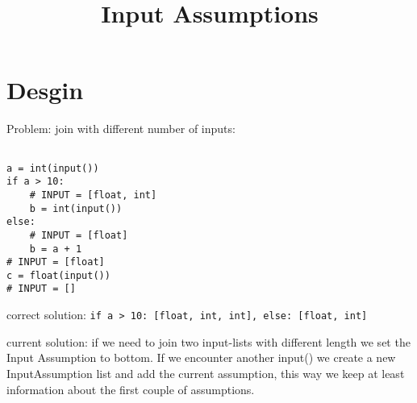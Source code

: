\documentclass[11pt]{article}
\begin{document}
\title{Input Assumptions}

\maketitle


\section{Desgin}

Problem: join with different number of inputs:

\begin{lstlisting}[numbers=none]

a = int(input())
if a > 10:
    # INPUT = [float, int]
    b = int(input())
else:
    # INPUT = [float]
    b = a + 1
# INPUT = [float]
c = float(input())
# INPUT = []
\end{lstlisting}

correct solution: \verb|if a > 10: [float, int, int], else: [float, int]|

current solution: if we need to join two input-lists with different length we set the Input Assumption to bottom. If we encounter another input() we create a new InputAssumption list and add the current assumption, this way we keep at least information about the first couple of assumptions.
\end{document}
